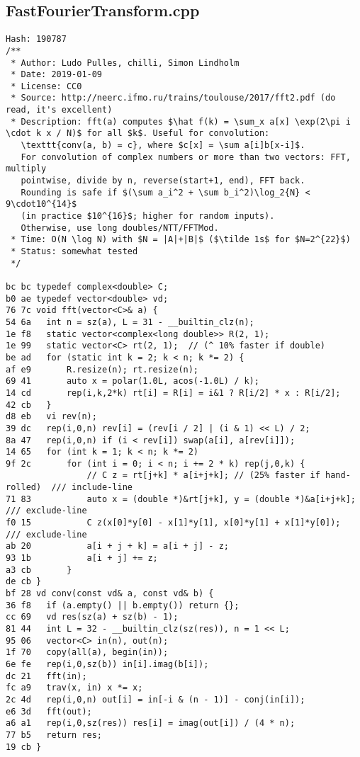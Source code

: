 \documentclass[11pt, a4paper, twoside]{article}
\begin{document}
\subsection{FastFourierTransform.cpp}
\begin{lstlisting}
Hash: 190787
/**
 * Author: Ludo Pulles, chilli, Simon Lindholm
 * Date: 2019-01-09
 * License: CC0
 * Source: http://neerc.ifmo.ru/trains/toulouse/2017/fft2.pdf (do read, it's excellent)
 * Description: fft(a) computes $\hat f(k) = \sum_x a[x] \exp(2\pi i \cdot k x / N)$ for all $k$. Useful for convolution:
   \texttt{conv(a, b) = c}, where $c[x] = \sum a[i]b[x-i]$.
   For convolution of complex numbers or more than two vectors: FFT, multiply
   pointwise, divide by n, reverse(start+1, end), FFT back.
   Rounding is safe if $(\sum a_i^2 + \sum b_i^2)\log_2{N} < 9\cdot10^{14}$
   (in practice $10^{16}$; higher for random inputs).
   Otherwise, use long doubles/NTT/FFTMod.
 * Time: O(N \log N) with $N = |A|+|B|$ ($\tilde 1s$ for $N=2^{22}$)
 * Status: somewhat tested
 */

bc bc typedef complex<double> C;
b0 ae typedef vector<double> vd;
76 7c void fft(vector<C>& a) {
54 6a 	int n = sz(a), L = 31 - __builtin_clz(n);
1e f8 	static vector<complex<long double>> R(2, 1);
1e 99 	static vector<C> rt(2, 1);  // (^ 10% faster if double)
be ad 	for (static int k = 2; k < n; k *= 2) {
af e9 		R.resize(n); rt.resize(n);
69 41 		auto x = polar(1.0L, acos(-1.0L) / k);
14 cd 		rep(i,k,2*k) rt[i] = R[i] = i&1 ? R[i/2] * x : R[i/2];
42 cb 	}
d8 eb 	vi rev(n);
39 dc 	rep(i,0,n) rev[i] = (rev[i / 2] | (i & 1) << L) / 2;
8a 47 	rep(i,0,n) if (i < rev[i]) swap(a[i], a[rev[i]]);
14 65 	for (int k = 1; k < n; k *= 2)
9f 2c 		for (int i = 0; i < n; i += 2 * k) rep(j,0,k) {
      			// C z = rt[j+k] * a[i+j+k]; // (25% faster if hand-rolled)  /// include-line
71 83 			auto x = (double *)&rt[j+k], y = (double *)&a[i+j+k];        /// exclude-line
f0 15 			C z(x[0]*y[0] - x[1]*y[1], x[0]*y[1] + x[1]*y[0]);           /// exclude-line
ab 20 			a[i + j + k] = a[i + j] - z;
93 1b 			a[i + j] += z;
a3 cb 		}
de cb }
bf 28 vd conv(const vd& a, const vd& b) {
36 f8 	if (a.empty() || b.empty()) return {};
cc 69 	vd res(sz(a) + sz(b) - 1);
81 44 	int L = 32 - __builtin_clz(sz(res)), n = 1 << L;
95 06 	vector<C> in(n), out(n);
1f 70 	copy(all(a), begin(in));
6e fe 	rep(i,0,sz(b)) in[i].imag(b[i]);
dc 21 	fft(in);
fc a9 	trav(x, in) x *= x;
2c 4d 	rep(i,0,n) out[i] = in[-i & (n - 1)] - conj(in[i]);
e6 3d 	fft(out);
a6 a1 	rep(i,0,sz(res)) res[i] = imag(out[i]) / (4 * n);
77 b5 	return res;
19 cb }
\end{lstlisting}
\end{document}
